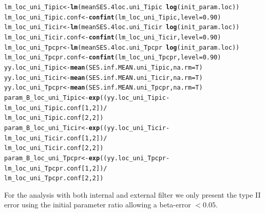\documentclass[12pt]{article}\usepackage[]{graphicx}\usepackage[]{color}
\makeatletter
\newcommand{\hlnum}[1]{\textcolor[rgb]{0.686,0.059,0.569}{#1}}%
\newcommand{\hlopt}[1]{\textcolor[rgb]{0,0,0}{#1}}%
\newcommand{\hlstd}[1]{\textcolor[rgb]{0.345,0.345,0.345}{#1}}%
\newcommand{\hlkwb}[1]{\textcolor[rgb]{0.69,0.353,0.396}{#1}}%
\newcommand{\hlkwc}[1]{\textcolor[rgb]{0.333,0.667,0.333}{#1}}%
\newcommand{\hlkwd}[1]{\textcolor[rgb]{0.737,0.353,0.396}{\textbf{#1}}}%
\newenvironment{kframe}{%
 \def\at@end@of@kframe{}%
 \ifinner\ifhmode%
  \def\at@end@of@kframe{\end{minipage}}%
  \begin{minipage}{\columnwidth}%
 \fi\fi%
 \def\FrameCommand##1{\hskip\@totalleftmargin \hskip-\fboxsep
 \colorbox{shadecolor}{##1}\hskip-\fboxsep
     \hskip-\linewidth \hskip-\@totalleftmargin \hskip\columnwidth}%
 \MakeFramed {\advance\hsize-\width
   \@totalleftmargin\z@ \linewidth\hsize
   \@setminipage}}%
 {\par\unskip\endMakeFramed%
 \at@end@of@kframe}
\newenvironment{knitrout}{}{} %
\makeatother
\begin{document}
\begin{knitrout}
\begin{kframe}
\begin{alltt}
\hlstd{lm_loc_uni_Tipic} \hlkwb{<-} \hlkwd{lm}\hlstd{(meanSES.4loc.uni_Tipic} \hlopt{~} \hlkwd{log}\hlstd{(init_param.loc))}
\hlstd{lm_loc_uni_Tipic.conf} \hlkwb{<-} \hlkwd{confint}\hlstd{(lm_loc_uni_Tipic,} \hlkwc{level} \hlstd{=} \hlnum{0.90}\hlstd{)}
\hlstd{lm_loc_uni_Ticir} \hlkwb{<-} \hlkwd{lm}\hlstd{(meanSES.4loc.uni_Ticir} \hlopt{~} \hlkwd{log}\hlstd{(init_param.loc))}
\hlstd{lm_loc_uni_Ticir.conf} \hlkwb{<-} \hlkwd{confint}\hlstd{(lm_loc_uni_Ticir,} \hlkwc{level} \hlstd{=} \hlnum{0.90}\hlstd{)}
\hlstd{lm_loc_uni_Tpcpr} \hlkwb{<-} \hlkwd{lm}\hlstd{(meanSES.4loc.uni_Tpcpr} \hlopt{~} \hlkwd{log}\hlstd{(init_param.loc))}
\hlstd{lm_loc_uni_Tpcpr.conf} \hlkwb{<-} \hlkwd{confint}\hlstd{(lm_loc_uni_Tpcpr,} \hlkwc{level} \hlstd{=} \hlnum{0.90}\hlstd{)}
\hlstd{yy.loc_uni_Tipic} \hlkwb{<-} \hlkwd{mean}\hlstd{(SES.inf.MEAN.uni_Tipic,} \hlkwc{na.rm} \hlstd{= T)}
\hlstd{yy.loc_uni_Ticir} \hlkwb{<-} \hlkwd{mean}\hlstd{(SES.inf.MEAN.uni_Ticir,} \hlkwc{na.rm} \hlstd{= T)}
\hlstd{yy.loc_uni_Tpcpr} \hlkwb{<-} \hlkwd{mean}\hlstd{(SES.inf.MEAN.uni_Tpcpr,} \hlkwc{na.rm} \hlstd{= T)}
\hlstd{param_B_loc_uni_Tipic} \hlkwb{<-} \hlkwd{exp}\hlstd{( (yy.loc_uni_Tipic} \hlopt{-} \hlstd{lm_loc_uni_Tipic.conf [}\hlnum{1}\hlstd{,} \hlnum{2}\hlstd{])} \hlopt{/}
                                  \hlstd{lm_loc_uni_Tipic.conf [}\hlnum{2}\hlstd{,} \hlnum{2}\hlstd{] )}
\hlstd{param_B_loc_uni_Ticir} \hlkwb{<-} \hlkwd{exp}\hlstd{( (yy.loc_uni_Ticir} \hlopt{-} \hlstd{lm_loc_uni_Ticir.conf [}\hlnum{1}\hlstd{,} \hlnum{2}\hlstd{])} \hlopt{/}
                                  \hlstd{lm_loc_uni_Ticir.conf [}\hlnum{2}\hlstd{,} \hlnum{2}\hlstd{] )}
\hlstd{param_B_loc_uni_Tpcpr} \hlkwb{<-} \hlkwd{exp}\hlstd{( (yy.loc_uni_Tpcpr} \hlopt{-} \hlstd{lm_loc_uni_Tpcpr.conf [}\hlnum{1}\hlstd{,} \hlnum{2}\hlstd{])} \hlopt{/}
                                  \hlstd{lm_loc_uni_Tpcpr.conf [}\hlnum{2}\hlstd{,} \hlnum{2}\hlstd{] )}
\end{alltt}
\end{kframe}
\end{knitrout}

For the analysis with both internal and external filter we only present the type II error using the initial parameter ratio allowing a beta-error $<0.05$.  
\end{document}
